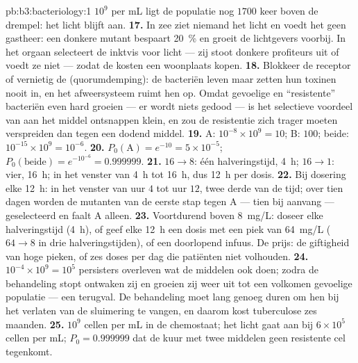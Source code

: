 \begin{solution}{pb:b3:bacteriology:1}
$10^{9}$ per mL ligt de populatie nog $1700$ keer boven de drempel: het
licht blijft aan.
\textbf{17.} In zee ziet niemand het licht en voedt het geen gastheer:
een donkere mutant bespaart \qty{20}{\%} en groeit de lichtgevers
voorbij. In het orgaan selecteert de inktvis voor licht --- zij stoot
donkere profiteurs uit of voedt ze niet --- zodat de kosten een
woonplaats kopen.
\textbf{18.} Blokkeer de receptor of vernietig de 
(quorumdemping): de bacteriën leven maar zetten hun toxinen nooit in,
en het afweersysteem ruimt hen op. Omdat gevoelige en ``resistente''
bacteriën even hard groeien --- er wordt niets gedood --- is het
selectieve voordeel van aan het middel ontsnappen klein, en zou de
resistentie zich trager moeten verspreiden dan tegen een dodend middel.
\textbf{19.} A: $10^{-8}\times 10^{9} = 10$; B: $100$; beide: $10^{-15}\times
10^{9} = 10^{-6}$.
\textbf{20.} $P_{0}(\text{A}) = e^{-10} = 5\times 10^{-5}$;
$P_{0}(\text{beide}) = e^{-10^{-6}} = 0.999999$.
\textbf{21.} $16 \to 8$: één halveringstijd, \qty{4}{h}; $16 \to 1$:
vier, \qty{16}{h}; in het venster van \qty{4}{h} tot \qty{16}{h}, dus
\qty{12}{h} per dosis.
\textbf{22.} Bij dosering elke \qty{12}{h}: in het venster van uur $4$
tot uur $12$, twee derde van de tijd; over tien dagen worden de
mutanten van de eerste stap tegen A --- tien bij aanvang ---
geselecteerd en faalt A alleen.
\textbf{23.} Voortdurend boven \qty{8}{mg/L}: doseer elke halveringstijd
(\qty{4}{h}), of geef elke \qty{12}{h} een dosis met een piek van
\qty{64}{mg/L} ($64 \to 8$ in drie halveringstijden), of een doorlopend
infuus. De prijs: de giftigheid van hoge pieken, of zes doses per dag
die patiënten niet volhouden.
\textbf{24.} $10^{-4}\times 10^{9} = 10^{5}$ persisters overleven wat de
middelen ook doen; zodra de behandeling stopt ontwaken zij en groeien
zij weer uit tot een volkomen gevoelige populatie --- een terugval. De
behandeling moet lang genoeg duren om hen bij het verlaten van de
sluimering te vangen, en daarom kost tuberculose zes maanden.
\textbf{25.} $10^{9}$ cellen per mL in de chemostaat; het licht gaat aan
bij $6\times 10^{5}$ cellen per mL; $P_{0} = 0.999999$ dat de kuur met
twee middelen geen resistente cel tegenkomt.
\end{solution}
